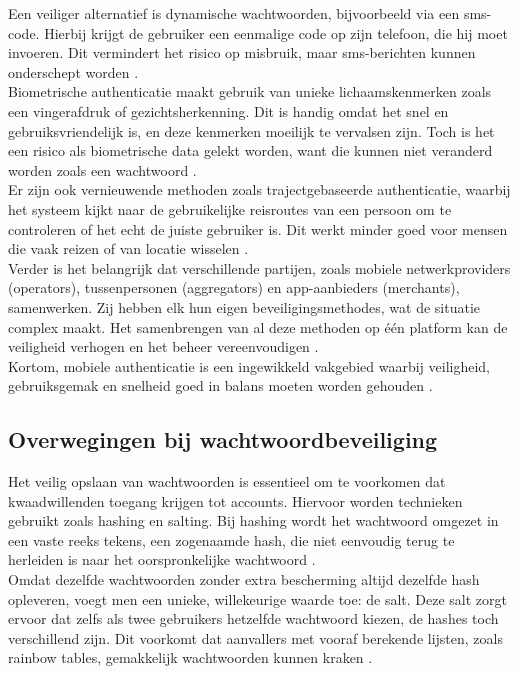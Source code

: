 Een veiliger alternatief is dynamische wachtwoorden, bijvoorbeeld via een sms-code. Hierbij krijgt de gebruiker een eenmalige code op zijn telefoon, die hij moet invoeren. Dit vermindert het risico op misbruik, maar sms-berichten kunnen onderschept worden \autocite{Zukarnain2022}.\\

Biometrische authenticatie maakt gebruik van unieke lichaamskenmerken zoals een vingerafdruk of gezichtsherkenning. Dit is handig omdat het snel en gebruiksvriendelijk is, en deze kenmerken moeilijk te vervalsen zijn. Toch is het een risico als biometrische data gelekt worden, want die kunnen niet veranderd worden zoals een wachtwoord \autocite{Zukarnain2022}.\\

Er zijn ook vernieuwende methoden zoals trajectgebaseerde authenticatie, waarbij het systeem kijkt naar de gebruikelijke reisroutes van een persoon om te controleren of het echt de juiste gebruiker is. Dit werkt minder goed voor mensen die vaak reizen of van locatie wisselen \autocite{Zukarnain2022}.\\

Verder is het belangrijk dat verschillende partijen, zoals mobiele netwerkproviders (operators), tussenpersonen (aggregators) en app-aanbieders (merchants), samenwerken. Zij hebben elk hun eigen beveiligingsmethodes, wat de situatie complex maakt. Het samenbrengen van al deze methoden op één platform kan de veiligheid verhogen en het beheer vereenvoudigen \textcite{Zukarnain2022}.\\

Kortom, mobiele authenticatie is een ingewikkeld vakgebied waarbij veiligheid, gebruiksgemak en snelheid goed in balans moeten worden gehouden \autocite{Zukarnain2022, Gao2023}.\\


\subsection{Overwegingen bij wachtwoordbeveiliging}
Het veilig opslaan van wachtwoorden is essentieel om te voorkomen dat kwaadwillenden toegang krijgen tot accounts. Hiervoor worden technieken gebruikt zoals hashing en salting. Bij hashing wordt het wachtwoord omgezet in een vaste reeks tekens, een zogenaamde hash, die niet eenvoudig terug te herleiden is naar het oorspronkelijke wachtwoord \autocite{Gupta2022}.\\

Omdat dezelfde wachtwoorden zonder extra bescherming altijd dezelfde hash opleveren, voegt men een unieke, willekeurige waarde toe: de salt. Deze salt zorgt ervoor dat zelfs als twee gebruikers hetzelfde wachtwoord kiezen, de hashes toch verschillend zijn. Dit voorkomt dat aanvallers met vooraf berekende lijsten, zoals rainbow tables, gemakkelijk wachtwoorden kunnen kraken \autocite{Arias2025}.\\

